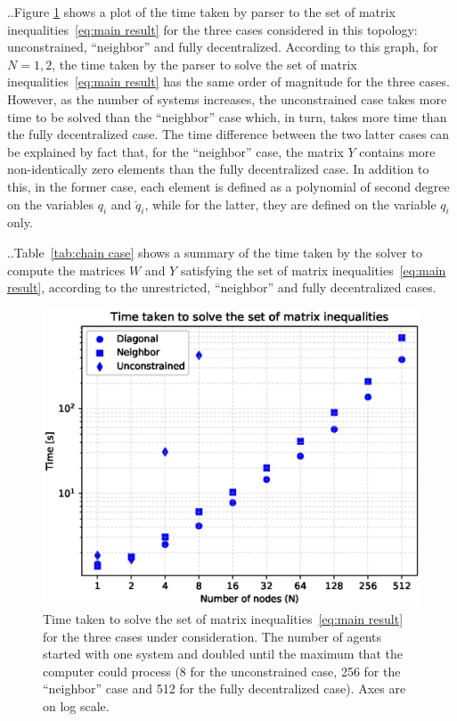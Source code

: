 \documentclass[10pt,twocolumn,twoside]{IEEEtran}
\newcounter{para}
\newcommand\mypara{\par \thesection.\refstepcounter{para}\thepara.\space}
\theoremstyle{plain}
\theoremstyle{definition}
\theoremstyle{remark}
\begin{document}
\mypara Figure \ref{fig:time graph} shows a plot of the time taken by parser to the set of matrix inequalities~\eqref{eq:main result} for the three cases considered in this topology: unconstrained, ``neighbor'' and fully decentralized.  According to this graph, for $N=1,2$, the time taken by the parser to solve the set of matrix inequalities~\eqref{eq:main result} has the same order of magnitude for the three cases. However, as the number of systems increases, the unconstrained case takes more time to be solved than the ``neighbor'' case which, in turn, takes more time than the fully decentralized case. The time difference between the two latter cases can be explained by fact that, for the ``neighbor'' case, the matrix $Y$ contains more non-identically zero elements than the fully decentralized case. In addition to this, in the former case, each element is defined as a polynomial of second degree on the variables $q_i$ and $\breve{q}_i$, while for the latter, they are defined on the variable $q_i$ only.

\mypara Table~\ref{tab:chain case} shows a summary of the time taken by the solver to compute the matrices $W$ and $Y$ satisfying the set of matrix inequalities~\eqref{eq:main result}, according to the unrestricted, ``neighbor'' and fully decentralized cases.

\begin{figure}[htpb!]
	\centering
	\includegraphics[width=\columnwidth]{./imgs/ParserTimes}\vspace{-2em}
	\caption{Time taken to solve the set of matrix inequalities~\eqref{eq:main result} for the three cases under consideration. The number of agents started with one system and doubled  until the maximum that the computer could process (8 for the unconstrained case, 256 for the ``neighbor'' case and 512 for the fully decentralized case). Axes are on log scale.}
	\label{fig:time graph}
\end{figure}
\end{document}
